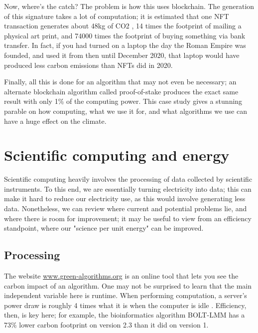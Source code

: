 \documentclass{article}
\begin{document}
Now, where's the catch? The problem is how this uses blockchain. The generation of this signature takes a lot of computation; it is estimated that one NFT transaction generates about 48kg of CO2 \citep{atken2020unreasonable}, 14 times the footprint of mailing a physical art print, and 74000 times the footprint of buying something via bank transfer. \citep{qiu2021what} In fact, if you had turned on a laptop the day the Roman Empire was founded, and used it from then until December 2020, that laptop would have produced less carbon emissions than NFTs did in 2020. \citep{atken2020unreasonable} \newline

Finally, all this is done for an algorithm that may not even be necessary; an alternate blockchain algorithm called proof-of-stake produces the exact same result with only 1\% of the computing power. \citep{saleh2021blockchain} This case study gives a stunning parable on how computing, what we use it for, and what algorithms we use can have a huge effect on the climate.



\section{Scientific computing and energy}
Scientific computing heavily involves the processing of data collected by scientific instruments. To this end, we are essentially turning electricity into data; this can make it hard to reduce our electricity use, as this would involve generating less data. Nonetheless, we can review where current and potential problems lie, and where there is room for improvement; it may be useful to view from an efficiency standpoint, where our "science per unit energy" can be improved.


\subsection{Processing}
The website \href{www.green-algorithms.org}{www.green-algorithms.org} \citep{lannelongue2021green} is an online tool that lets you see the carbon impact of an algorithm. One may not be surprised to learn that the main independent variable here is runtime. When performing computation, a server's power draw is roughly 4 times what it is when the computer is idle \citep{lannelongue2021ten}. Efficiency, then, is key here; for example, the bioinformatics algorithm BOLT-LMM has a 73\% lower carbon footprint on version 2.3 than it did on version 1.  \citep{grealey2021carbon} \newline
\end{document}
